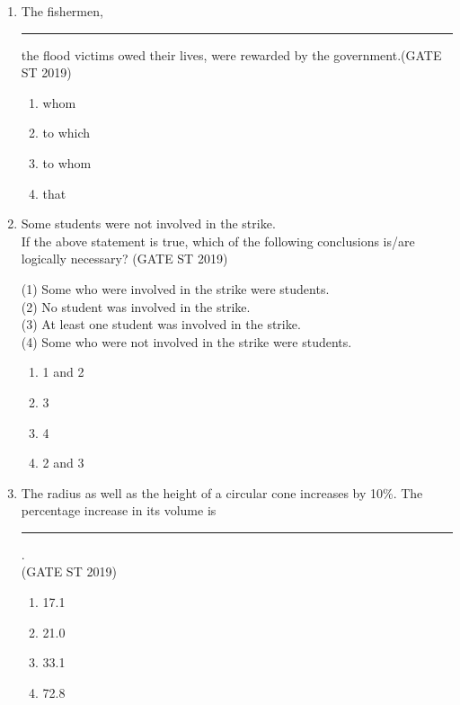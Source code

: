 \documentclass[journal]{IEEEtran}
\begin{document}
\begin{enumerate}

 

\item The fishermen, \rule{2cm}{0.1pt} the flood victims  owed their lives, were rewarded by the government.\hfill(GATE ST 2019)
\begin{multicols}{4}
\begin{enumerate}
    \item whom
    \item to which
    \item to whom
    \item that
\end{enumerate}
\end{multicols}

\item Some students were not involved in the strike.
\\
If the above statement is true, which of the following conclusions is/are logically necessary? \hfill(GATE ST 2019)

(1) Some who were involved in the strike were students.\\
(2) No student was involved in the strike.\\
(3) At least one student was involved in the strike.\\
(4) Some who were not involved in the strike were students.

\begin{multicols}{4}
  \begin{enumerate}
    \item 1 and 2 \hspace{1cm}
    \item 3 \hspace{1cm}
    \item4 \hspace{1cm}
    \item 2 and 3
\end{enumerate}
\end{multicols}

\item The radius as well as the height of a circular cone increases by 10\%. The percentage increase in its volume is \rule{2cm}{0.1pt}. \\
\hspace*{15.7cm}(GATE ST 2019)
\begin{multicols}{4}
\begin{enumerate}
    \item 17.1
    \item 21.0
    \item 33.1
    \item 72.8
\end{enumerate}
\end{multicols}


\end{enumerate}
\end{document}
